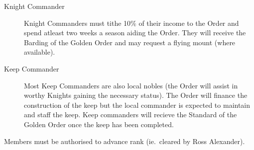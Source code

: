 \documentclass[a4paper]{article}
\begin{document}
\begin{multicols*}{3}
\begin{description}
\item[Knight Commander] Knight Commanders must tithe 10\% of their
  income to the Order and spend atleast two weeks a season aiding the
  Order.  They will receive the Barding of the Golden Order and may
  request a flying mount (where available).

\item[Keep Commander] Most Keep Commanders are also local nobles (the
  Order will assist in worthy Knights gaining the necessary status).
  The Order will finance the construction of the keep but the local
  commander is expected to maintain and staff the keep.  Keep
  commanders will recieve the Standard of the Golden Order once the
  keep has been completed.

\end{description}

Members must be authorised to advance rank (ie.\ cleared by Ross
Alexander).

\end{multicols*}
\end{document}
